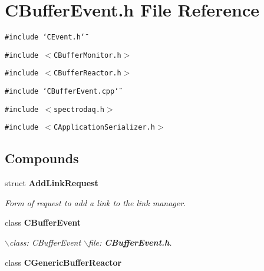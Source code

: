 \section{CBuffer\-Event.h File Reference}
\label{CBufferEvent_8h}
{\tt \#include \char`\"{}CEvent.h\char`\"{}}\par
{\tt \#include $<$CBuffer\-Monitor.h$>$}\par
{\tt \#include $<$CBuffer\-Reactor.h$>$}\par
{\tt \#include \char`\"{}CBuffer\-Event.cpp\char`\"{}}\par
{\tt \#include $<$spectrodaq.h$>$}\par
{\tt \#include $<$CApplication\-Serializer.h$>$}\par
\subsection*{Compounds}
\begin{CompactItemize}
\item 
struct {\bf Add\-Link\-Request}
\begin{CompactList}\small\item\em Form of request to add a link to the link manager.\item\end{CompactList}\item 
class {\bf CBuffer\-Event}
\begin{CompactList}\small\item\em $\backslash$class: CBuffer\-Event $\backslash$file: {\bf CBuffer\-Event.h}.\item\end{CompactList}\item 
class {\bf CGeneric\-Buffer\-Reactor}
\end{CompactItemize}
